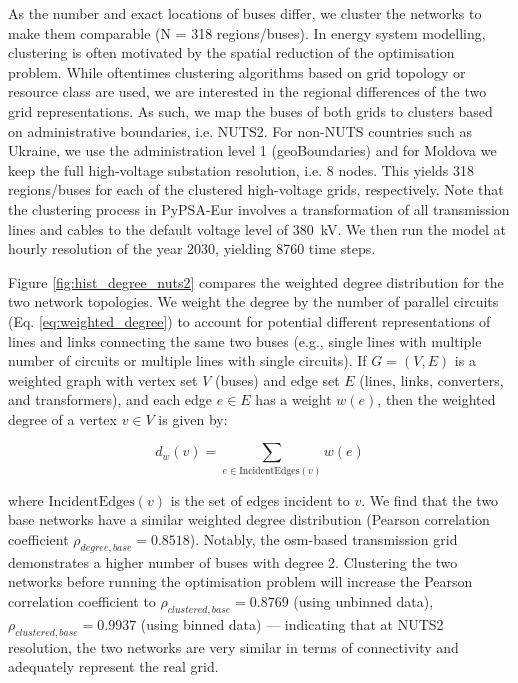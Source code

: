 \documentclass[fleqn,10pt]{wlscirep}
\let\autocite\cite
\begin{document}
As the number and exact locations of buses differ, we cluster the networks to make them comparable (N = 318 regions/buses). In energy system modelling, clustering is often motivated by the spatial reduction of the optimisation problem. While oftentimes clustering algorithms based on grid topology or resource class are used, \autocite{frysztackiComparisonClusteringMethods2022} we are interested in the regional differences of the two grid representations. As such, we map the buses of both grids to clusters based on administrative boundaries, i.e. NUTS2. For non-NUTS countries such as Ukraine, we use the administration level 1 (geoBoundaries\autocite{runfolaGeoBoundariesGlobalDatabase2020}) and for Moldova we keep the full high-voltage substation resolution, i.e. 8 nodes. This yields 318 regions/buses for each of the clustered high-voltage grids, respectively. Note that the clustering process in PyPSA-Eur involves a transformation of all transmission lines and cables to the default voltage level of \SI{380}{\kilo\volt}. We then run the model at hourly resolution of the year 2030, yielding 8760 time steps. 

Figure \ref{fig:hist_degree_nuts2} compares the weighted degree distribution for the two network topologies. We weight the degree by the number of parallel circuits (Eq. \ref{eq:weighted_degree}) to account for potential different representations of lines and links connecting the same two buses (e.g., single lines with multiple number of circuits or multiple lines with single circuits). If \( G = (V, E) \) is a weighted graph with vertex set \( V \) (buses) and edge set \( E \) (lines, links, converters, and transformers), and each edge \( e \in E \) has a weight \( w(e) \), then the weighted degree of a vertex \( v \in V \) is given by:


\begin{equation}
    d_w(v) = \sum_{e \in \text{IncidentEdges}(v)} w(e)
    \label{eq:weighted_degree}
\end{equation}

where \( \text{IncidentEdges}(v) \) is the set of edges incident to \( v \). We find that the two base networks have a similar weighted degree distribution (Pearson correlation coefficient $\rho_{degree,base} = 0.8518$). Notably, the \acrshort{osm}-based transmission grid demonstrates a higher number of buses with degree 2. Clustering the two networks before running the optimisation problem will increase the Pearson correlation coefficient to $\rho_{clustered,base} = 0.8769$ (using unbinned data), $\rho_{clustered,base} = 0.9937$ (using binned data) --- indicating that at NUTS2 resolution, the two networks are very similar in terms of connectivity and adequately represent the real grid.
\end{document}
